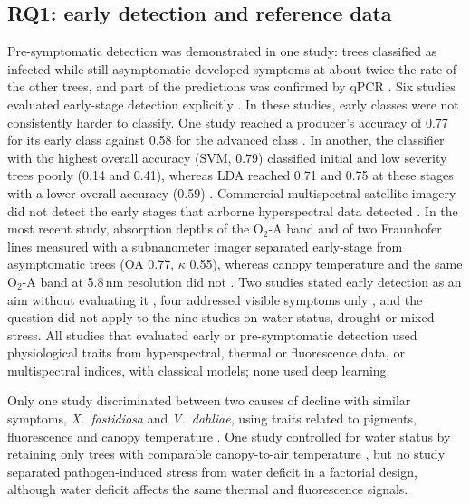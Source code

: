 \documentclass[preprint,12pt]{elsarticle}
\begin{document}
\subsection{RQ1: early detection and reference data}\label{sec:early}
Pre-symptomatic detection was demonstrated in one study: trees classified as infected while still asymptomatic developed symptoms at about twice the rate of the other trees, and part of the predictions was confirmed by qPCR \citep{u008}. Six studies evaluated early-stage detection explicitly \citep{u002,u036,u030,u056,u113,u121}. In these studies, early classes were not consistently harder to classify. One study reached a producer's accuracy of 0.77 for its early class against 0.58 for the advanced class \citep{u036}. In another, the classifier with the highest overall accuracy (SVM, 0.79) classified initial and low severity trees poorly (0.14 and 0.41), whereas LDA reached 0.71 and 0.75 at these stages with a lower overall accuracy (0.59) \citep{u002}. Commercial multispectral satellite imagery did not detect the early stages that airborne hyperspectral data detected \citep{u056}. In the most recent study, absorption depths of the O$_2$-A band and of two Fraunhofer lines measured with a subnanometer imager separated early-stage from asymptomatic trees (OA 0.77, $\kappa$ 0.55), whereas canopy temperature and the same O$_2$-A band at 5.8\,nm resolution did not \citep{u121}. Two studies stated early detection as an aim without evaluating it \citep{u021,kallel2022olive}, four addressed visible symptoms only \citep{u013,u046,u055,u080}, and the question did not apply to the nine studies on water status, drought or mixed stress. All studies that evaluated early or pre-symptomatic detection used physiological traits from hyperspectral, thermal or fluorescence data, or multispectral indices, with classical models; none used deep learning.
 
Only one study discriminated between two causes of decline with similar symptoms, \textit{X.~fastidiosa} and \textit{V.~dahliae}, using traits related to pigments, fluorescence and canopy temperature \citep{u030}. One study controlled for water status by retaining only trees with comparable canopy-to-air temperature \citep{u121}, but no study separated pathogen-induced stress from water deficit in a factorial design, although water deficit affects the same thermal and fluorescence signals.
 
\end{document}
